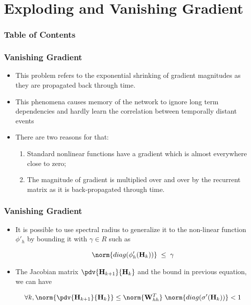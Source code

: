 \documentclass[11pt,]{beamer}
\begin{document}
\section{Exploding and Vanishing Gradient}
\begin{frame}
	\frametitle{Table of Contents}
	\tableofcontents[currentsection]
\end{frame}

\begin{frame}
	\frametitle{Vanishing Gradient}
	\begin{itemize}
		\item This problem refers to the exponential shrinking of gradient
		magnitudes as they are propagated back through time.
		\bigskip
		\item This phenomena causes memory of the network to ignore long
		term dependencies and hardly learn the correlation between
		temporally distant events
		\bigskip
		\item There are two reasons for that:
		\begin{enumerate}
			\item Standard nonlinear functions have a gradient which is almost everywhere close to zero;
			\item The magnitude of gradient is multiplied over and over by the recurrent matrix as it is back-propagated through time.
		\end{enumerate}
	\end{itemize}
\end{frame}

\begin{frame}
	\frametitle{Vanishing Gradient}
	\begin{itemize}
		\item It is possible to use spectral radius to generalize it to the non-linear function $\phi'_h$ by bounding it with $\gamma \in R$
		such as
		\bigskip
	\begin{block}{}
		\begin{equation*}
			\norm{diag(\phi'_h(\mathbf{H}_k))} \; \le \; \gamma
		\end{equation*}
	\end{block}
		\bigskip
		\item The Jacobian matrix $\pdv{\mathbf{H}_{k+1}}{\mathbf{H}_k}$ and the bound
		in previous equation, we can have
	\begin{block}{}
		\bigskip
		\begin{equation*}
			\forall k, \norm{\pdv{\mathbf{H}_{k+1}}{\mathbf{H}_k}}  \le \norm{\mathbf{W}_{hh}^T} \;
			 \norm{diag(\sigma'(\mathbf{H}_k))} <  1
		\end{equation*}
	\end{block}
\end{itemize}
\end{frame}
\end{document}
